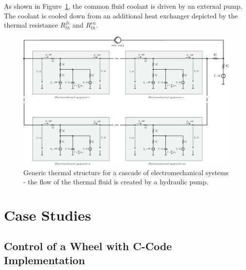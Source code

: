 \documentclass[11pt,a4paper,oneside]{book}
\numberwithin{equation}{section}
\theoremstyle{it}
\theoremstyle{definition}
\begin{document}
As shown in Figure~\ref{fig3}, the common fluid coolant is driven by an external pump. The coolant is cooled down from an additional heat exchanger depicted by the thermal resistance $R_{th}^{fe}$ and $R_{th}^{ea}$.
\begin{figure}[H]
	\centering
	\includegraphics[width = 600pt, angle = 90, keepaspectratio]{figures/generic_thermal_model/generic_thermal_model_2.eps}
	\captionsetup{width=0.5\textwidth, font=small}	
	\caption{Generic thermal structure for a cascade of electromechanical systems - the flow of the thermal fluid is created by a hydraulic pump.}
	\label{fig3}
\end{figure}


\chapter{Case Studies}

\section{Control of a Wheel with C-Code Implementation}
\end{document}
